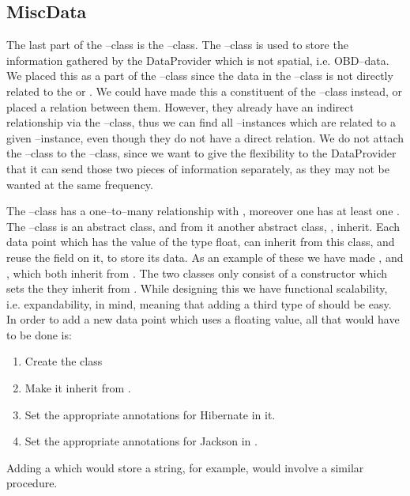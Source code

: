 \subsection{MiscData}\label{ssec:miscdata}
The last part of the --class is the --class. 
The --class is used to store the information gathered by the DataProvider which is not spatial, i.e. \ac{OBD}--data.
We placed this as a part of the --class since the data in the --class is not directly related to the  or . 
We could have made this a constituent of the --class instead, or placed a relation between them.
However, they already have an indirect relationship via the --class, 
thus we can find all --instances which are related to a given --instance, even though they do not have a direct relation. 
We do not attach the --class to the --class, 
since we want to give the flexibility to the DataProvider that it can send those two pieces of information separately, as they may not be wanted at the same frequency. 

The --class has a one--to--many relationship with , moreover one  has at least one . 
The --class is an abstract class, and from it another abstract class, , inherit. 
Each data point which has the value of the type float, can inherit from this class, and reuse the  field on it, to store its data.
As an example of these we have made , and , which both inherit from . 
The two classes only consist of a constructor which sets the  they inherit from .
While designing this we have functional scalability, i.e. expandability, in mind, meaning that adding a third type of  should be easy. 
In order to add a new data point which uses a floating value, all that would have to be done is: 
\begin{enumerate}
    \item Create the class 
    \item Make it inherit from .
    \item Set the appropriate annotations for Hibernate in it.
    \item Set the appropriate annotations for Jackson in .
\end{enumerate}

Adding a  which would store a string, for example, would involve a similar procedure.
